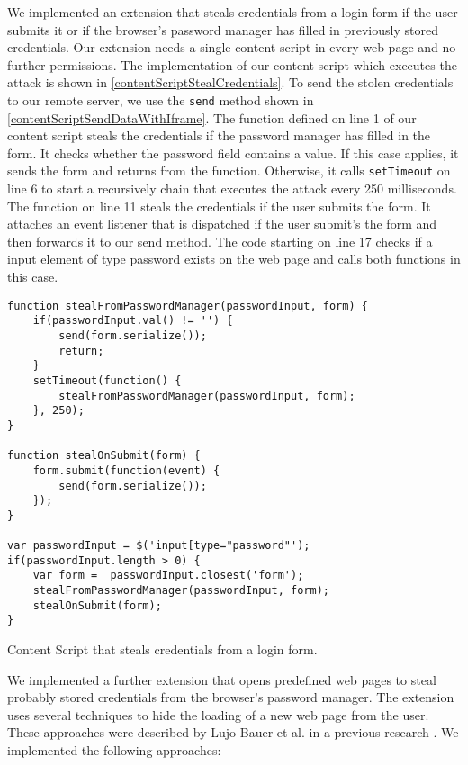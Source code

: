 			We implemented an extension that steals credentials from a login form if the user submits it or if the browser's password manager has filled in previously stored credentials. Our extension needs a single content script in every web page and no further permissions. The implementation of our content script which executes the attack is shown in \autoref{contentScriptStealCredentials}. To send the stolen credentials to our remote server, we use the \texttt{send} method shown in \autoref{contentScriptSendDataWithIframe}. The function defined on line 1 of our content script steals the credentials if the password manager has filled in the form. It checks whether the password field contains a value. If this case applies, it sends the form and returns from the function. Otherwise, it calls \texttt{setTimeout} on line 6 to start a recursively chain that executes the attack every 250 milliseconds. The function on line 11 steals the credentials if the user submits the form. It attaches an event listener that is dispatched if the user submit's the form and then forwards it to our send method. The code starting on line 17 checks if a input element of type password exists on the web page and calls both functions in this case. 
			
			\begin{code}
				\begin{lstlisting}
function stealFromPasswordManager(passwordInput, form) {
	if(passwordInput.val() != '') {
		send(form.serialize());
		return;
	}
	setTimeout(function() {
		stealFromPasswordManager(passwordInput, form);
	}, 250);
}

function stealOnSubmit(form) {
	form.submit(function(event) {
		send(form.serialize());
	});
}

var passwordInput = $('input[type="password"');
if(passwordInput.length > 0) {
	var form =  passwordInput.closest('form');
	stealFromPasswordManager(passwordInput, form);
	stealOnSubmit(form);
}\end{lstlisting}
				\caption{Content Script that steals credentials from a login form.}
				\label{contentScriptStealCredentials}
			\end{code}
		
			We implemented a further extension that opens predefined web pages to steal probably stored credentials from the browser's password manager. The extension uses several techniques to hide the loading of a new web page from the user. These approaches were described by Lujo Bauer et al. in a previous research \cite{extensions:cns14}. We implemented the following approaches:
			
